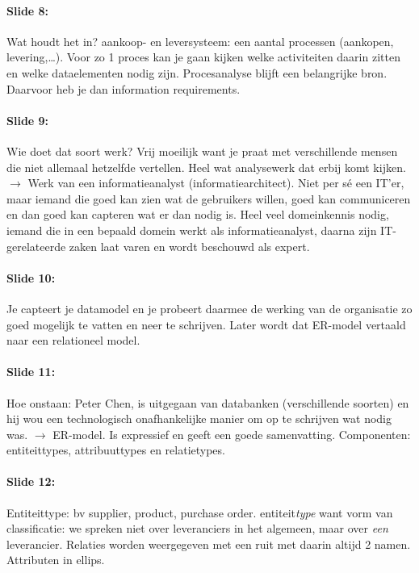 \documentclass[10pt,a4paper]{report}
\begin{document}
\paragraph{Slide 8:}Wat houdt het in? aankoop- en leversysteem: een aantal processen (aankopen, levering,…). Voor zo 1 proces kan je gaan kijken welke activiteiten daarin zitten en welke dataelementen nodig zijn. Procesanalyse blijft een belangrijke bron. Daarvoor heb je dan information requirements.

\paragraph{Slide 9:}Wie doet dat soort werk? Vrij moeilijk want je praat met verschillende mensen die niet allemaal hetzelfde vertellen. Heel wat analysewerk dat erbij komt kijken. $\rightarrow$ Werk van een informatieanalyst (informatiearchitect). Niet per s\'e een IT'er, maar iemand die goed kan zien wat de gebruikers willen, goed kan communiceren en dan goed kan capteren wat er dan nodig is. Heel veel domeinkennis nodig, iemand die in een bepaald domein werkt als informatieanalyst, daarna zijn IT-gerelateerde zaken laat varen en wordt beschouwd als expert.

\paragraph{Slide 10:}Je capteert je datamodel en je probeert daarmee de werking van de organisatie zo goed mogelijk te vatten en neer te schrijven. Later wordt dat ER-model vertaald naar een relationeel model.

\paragraph{Slide 11:}Hoe onstaan: Peter Chen, is uitgegaan van databanken (verschillende soorten) en hij wou een technologisch onafhankelijke manier om op te schrijven wat nodig was. $\rightarrow$ ER-model.
Is expressief en geeft een goede samenvatting. Componenten: entiteittypes, attribuuttypes en relatietypes.

\paragraph{Slide 12:}Entiteittype: bv supplier, product, purchase order. entiteit\emph{type} want vorm van classificatie: we spreken niet over leveranciers in het algemeen, maar over \emph{een} leverancier. Relaties worden weergegeven met een ruit met daarin altijd 2 namen. Attributen in ellips.
\end{document}
